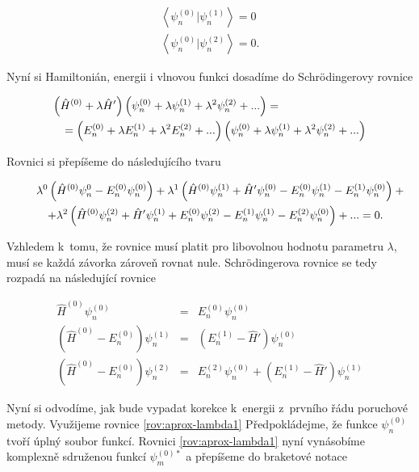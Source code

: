 \begin{eqnarray}
\left <\psi^{(0)}_n |\psi^{(1)}_n \right >=0\\
\left <\psi^{(0)}_n |\psi^{(2)}_n \right >=0. 
\end{eqnarray}

\noindent Nyní si Hamiltonián, energii i vlnovou funkci dosadíme do Schrödingerovy rovnice

\begin{eqnarray}
\lefteqn{ \left(\hat{H}^{(0)}+\lambda \hat{H}'\right)\left(\psi^{(0)}_{n}+\lambda \psi^{(1)}_{n}+\lambda^2 \psi^{(2)}_{n}+...\right)=}
\nonumber\\
&&=\left(E^{(0)}_{n}+\lambda E^{(1)}_{n}+\lambda^2 E^{(2)}_{n}+...\right)\left(\psi^{(0)}_{n}+\lambda \psi^{(1)}_{n}+\lambda^2 \psi^{(2)}_{n}+...\right)
\end{eqnarray}

\noindent Rovnici si přepíšeme do následujícího tvaru

\begin{eqnarray}
\lefteqn{ \lambda^0\left(\hat{H}^{(0)}\psi^{0}_{n}-E^{(0)}_{n}\psi^{(0)}_{n}\right)+
\lambda^1\left(\hat{H}^{(0)}\psi^{(1)}_{n}+\hat{H}'\psi^{(0)}_{n}-E^{(0)}_{n}\psi^{(1)}_{n}-E^{(1)}_{n}\psi^{(0)}_{n}\right)+{}}
\nonumber\\
&& + 
\lambda^2\left(\hat{H}^{(0)}\psi^{(2)}_{n}+\hat{H}'\psi^{(1)}_{n}+E^{(0)}_{n}\psi^{(2)}_{n}-E^{(1)}_{n}\psi^{(1)}_{n}-E^{(2)}_{n}\psi^{(0)}_{n}\right)+...=0.
\end{eqnarray}

\noindent Vzhledem k~tomu, že rovnice musí platit pro libovolnou hodnotu parametru $\lambda$, musí se každá závorka zároveň rovnat nule. Schrödingerova rovnice se tedy rozpadá na následující rovnice

\begin{eqnarray}
\hat{H}^{(0)}\psi^{(0)}_{n} &=&E^{(0)}_{n}\psi^{(0)}_{n}\\
\left(\hat{H}^{(0)}-E^{(0)}_{n}\right)\psi^{(1)}_{n} &=&\left(E^{(1)}_{n}-\hat{H}'\right)\psi^{(0)}_{n}
\label{rov:aprox-lambda1} 
\\
\left(\hat{H}^{(0)}-E^{(0)}_{n}\right)\psi^{(2)}_{n} &=&E^{(2)}_{n}\psi^{(0)}_{n}+\left(E^{(1)}_{n}-\hat{H}'\right)\psi^{(1)}_{n}
\end{eqnarray}

Nyní si odvodíme, jak bude vypadat korekce k~energii z~prvního řádu poruchové metody. Využijeme rovnice \ref{rov:aprox-lambda1} Předpokládejme, že funkce $\psi_n^{(0)}$ tvoří úplný soubor funkcí.
Rovnici \ref{rov:aprox-lambda1} nyní vynásobíme komplexně sdruženou funkcí $ \psi_m^{(0)*} $ a přepíšeme do braketové notace

